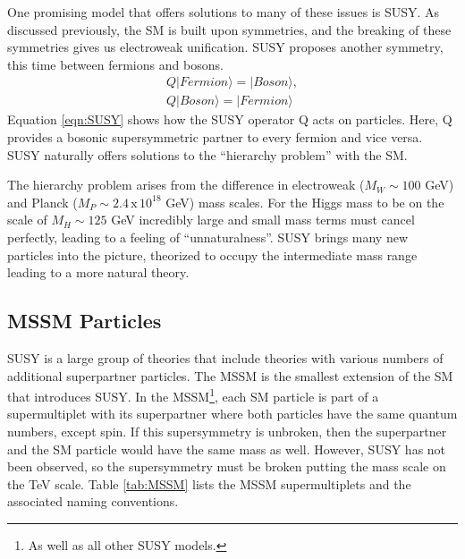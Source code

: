 	One promising model that offers solutions to many of these issues is \gls{SUSY}. As discussed previously, the \gls{SM} is built upon symmetries, and the breaking of these symmetries gives us electroweak unification. \gls{SUSY} proposes another symmetry, this time between fermions and bosons. 
	\begin{equation}\label{eqn:SUSY}
	\begin{split}
		Q | Fermion \rangle = | Boson \rangle, \\
		Q | Boson \rangle = | Fermion \rangle
	\end{split}
	\end{equation}
	Equation \ref{eqn:SUSY} shows how the \gls{SUSY} operator Q acts on particles. Here, Q provides a bosonic supersymmetric partner to every fermion and vice versa. \gls{SUSY} naturally offers solutions to the ``hierarchy problem'' with the \gls{SM}. 

	The hierarchy problem arises from the difference in electroweak ($M_W\sim100$ GeV)  and Planck ($M_P\sim2.4\, \mathrm{x} \, 10^{18}$ GeV) mass scales. For the Higgs mass to be on the scale of $M_H \sim 125$ GeV incredibly large and small mass terms must cancel perfectly, leading to a feeling of ``unnaturalness''. \gls{SUSY} brings many new particles into the picture, theorized to occupy the intermediate mass range leading to a more natural theory.

	\subsection{\acrlong{MSSM} Particles}\label{ssec:MSMM}
		\gls{SUSY} is a large group of theories that include theories with various numbers of additional superpartner particles. The \gls{MSSM} is the smallest extension of the \gls{SM} that introduces \gls{SUSY}. In the \gls{MSSM}\footnote{As well as all other \gls{SUSY} models.}, each \gls{SM} particle is part of a supermultiplet with its superpartner where both particles have the same quantum numbers, except spin. If this supersymmetry is unbroken, then the superpartner and the \gls{SM} particle would have the same mass as well. However, \gls{SUSY} has not been observed, so the supersymmetry must be broken putting the mass scale on the TeV scale. Table \ref{tab:MSSM} lists the \gls{MSSM} supermultiplets and the associated naming conventions.

